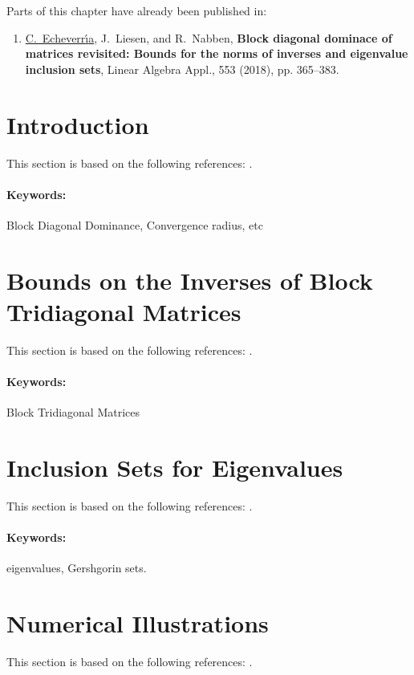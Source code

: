 \ifnum{}

Parts of this chapter have already been published in:
\begin{enumerate}
\item[\cite{EchLieNab18}] \underline{C.~Echeverr{\'\i}a}, J.~Liesen, and R.~Nabben, \textbf{Block diagonal dominace of matrices revisited: Bounds for the norms of inverses and eigenvalue inclusion sets}, Linear Algebra Appl., 553 (2018), pp. 365--383.
\end{enumerate}


\section{Introduction}
This section is based on the following references: \cite{BerPle94, FonPet01, Ike79, Nabben99, Nabben99-2, Usm94, Yue06}.
\paragraph{Keywords:} Block Diagonal Dominance, Convergence radius, etc


\section{Bounds on the Inverses of Block Tridiagonal Matrices}
This section is based on the following references: \cite{EchLieNab18}.
\paragraph{Keywords:} Block Tridiagonal Matrices


\section{Inclusion Sets for Eigenvalues}
This section is based on the following references: \cite{Var11}.
\paragraph{Keywords:} eigenvalues, Gershgorin sets.


\section{Numerical Illustrations}
This section is based on the following references: \cite{EchLieNab18}.
